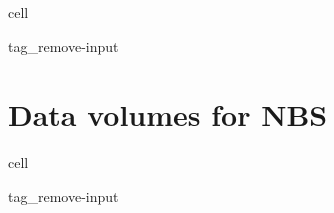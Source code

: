 \documentclass[letterpaper,10pt,english]{jupyterBook}
\begin{document}
\begin{sphinxuseclass}{cell}
\begin{sphinxuseclass}{tag_remove-input}
\end{sphinxuseclass}
\end{sphinxuseclass}
\sphinxstepscope


\chapter{Data volumes for NBS}
\label{\detokenize{volumes:data-volumes-for-nbs}}\label{\detokenize{volumes::doc}}
\begin{sphinxuseclass}{cell}
\begin{sphinxuseclass}{tag_remove-input}
\end{sphinxuseclass}
\end{sphinxuseclass}
\end{document}
